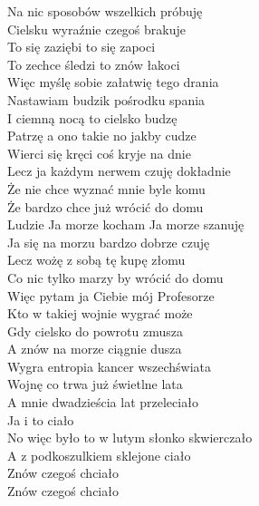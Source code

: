 Na nic sposobów wszelkich próbuję \\
Cielsku wyraźnie czegoś brakuje \\
To się zaziębi to się zapoci \\
To zechce śledzi to znów łakoci \\

Więc myślę sobie załatwię tego drania \\
Nastawiam budzik pośrodku spania \\
I ciemną nocą to cielsko budzę \\
Patrzę a ono takie no jakby cudze \\

Wierci się kręci coś kryje na dnie \\
Lecz ja każdym nerwem czuję dokładnie \\
Że nie chce wyznać mnie byle komu \\
Że bardzo chce już wrócić do domu \\

Ludzie Ja morze kocham Ja morze szanuję \\
Ja się na morzu bardzo dobrze czuję \\
Lecz wożę z sobą tę kupę złomu \\
Co nic tylko marzy by wrócić do domu \\

Więc pytam ja Ciebie mój Profesorze \\
Kto w takiej wojnie wygrać może \\
Gdy cielsko do powrotu zmusza \\
A znów na morze ciągnie dusza \\

Wygra entropia kancer wszechświata \\
Wojnę co trwa już świetlne lata \\
A mnie dwadzieścia lat przeleciało \\
Ja i to ciało \\

No więc było to w lutym słonko skwierczało \\
A z podkoszulkiem sklejone ciało \\
Znów czegoś chciało \\
Znów czegoś chciało